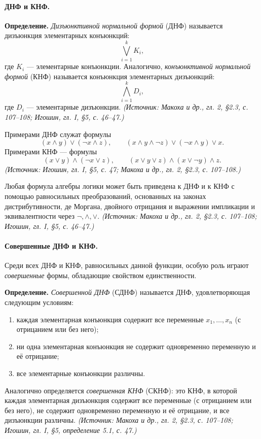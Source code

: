 \documentclass[a4paper,12pt]{article}
\begin{document}
\paragraph{ДНФ и КНФ.}
\textbf{Определение.} \emph{Дизъюнктивной нормальной формой} (ДНФ) называется дизъюнкция элементарных конъюнкций:
\[
\bigvee_{i=1}^{k}K_i,
\]
где \(K_i\) — элементарные конъюнкции. Аналогично, \emph{конъюнктивной нормальной формой} (КНФ) называется конъюнкция элементарных дизъюнкций:
\[
\bigwedge_{i=1}^{k}D_i,
\]
где \(D_i\) — элементарные дизъюнкции.
\textit{(Источник: Макоха и др., гл. 2, §2.3, с. 107--108; Игошин, гл. I, §5, с. 46--47.)}

Примерами ДНФ служат формулы
\[
(x\land y)\lor(\neg x\land z),\qquad
(x\land y\land\neg z)\lor(\neg x\land y)\lor x.
\]
Примерами КНФ — формулы
\[
(x\lor y)\land(\neg x\lor z),\qquad
(x\lor y\lor z)\land(x\lor\neg y)\land z.
\]
\textit{(Источник: Игошин, гл. I, §5, с. 47; Макоха и др., гл. 2, §2.3, с. 107--108.)}

Любая формула алгебры логики может быть приведена к ДНФ и к КНФ с помощью равносильных преобразований, основанных на законах дистрибутивности, де Моргана, двойного отрицания и выражении импликации и эквивалентности через \(\neg,\land,\lor\).
\textit{(Источник: Макоха и др., гл. 2, §2.3, с. 107--108; Игошин, гл. I, §5, с. 46--47.)}

\paragraph{Совершенные ДНФ и КНФ.}
Среди всех ДНФ и КНФ, равносильных данной функции, особую роль играют \emph{совершенные} формы, обладающие свойством единственности.

\textbf{Определение.} \emph{Совершенной ДНФ} (СДНФ) называется ДНФ, удовлетворяющая следующим условиям:
\begin{enumerate}[label=\arabic*)]
\item каждая элементарная конъюнкция содержит все переменные \(x_1,\ldots,x_n\) (с отрицанием или без него);
\item ни одна элементарная конъюнкция не содержит одновременно переменную и её отрицание;
\item все элементарные конъюнкции различны.
\end{enumerate}
Аналогично определяется \emph{совершенная КНФ} (СКНФ): это КНФ, в которой каждая элементарная дизъюнкция содержит все переменные (с отрицанием или без него), не содержит одновременно переменную и её отрицание, и все дизъюнкции различны.
\textit{(Источник: Макоха и др., гл. 2, §2.3, с. 107--108; Игошин, гл. I, §5, определение 5.1, с. 47.)}
\end{document}
